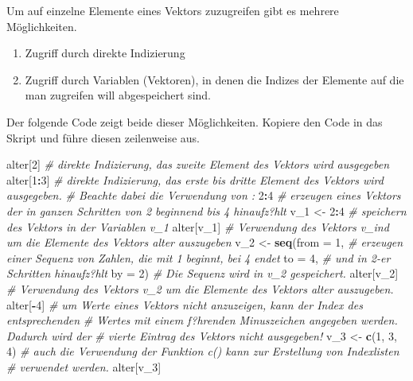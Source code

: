 \documentclass[]{article}
\newenvironment{Shaded}{\begin{snugshade}}{\end{snugshade}}
\newcommand{\KeywordTok}[1]{\textcolor[rgb]{0.13,0.29,0.53}{\textbf{#1}}}
\newcommand{\DataTypeTok}[1]{\textcolor[rgb]{0.13,0.29,0.53}{#1}}
\newcommand{\DecValTok}[1]{\textcolor[rgb]{0.00,0.00,0.81}{#1}}
\newcommand{\StringTok}[1]{\textcolor[rgb]{0.31,0.60,0.02}{#1}}
\newcommand{\CommentTok}[1]{\textcolor[rgb]{0.56,0.35,0.01}{\textit{#1}}}
\newcommand{\OperatorTok}[1]{\textcolor[rgb]{0.81,0.36,0.00}{\textbf{#1}}}
\newcommand{\NormalTok}[1]{#1}
\providecommand{\tightlist}{%
  \setlength{\itemsep}{0pt}\setlength{\parskip}{0pt}}
\begin{document}
Um auf einzelne Elemente eines Vektors zuzugreifen gibt es mehrere
Möglichkeiten.

\begin{enumerate}
\def\labelenumi{\arabic{enumi}.}
\tightlist
\item
  Zugriff durch direkte Indizierung
\item
  Zugriff durch Variablen (Vektoren), in denen die Indizes der Elemente
  auf die man zugreifen will abgespeichert sind.
\end{enumerate}

Der folgende Code zeigt beide dieser Möglichkeiten. Kopiere den Code in
das Skript und führe diesen zeilenweise aus.

\begin{Shaded}
\begin{Highlighting}[]
\NormalTok{    alter[}\DecValTok{2}\NormalTok{]   }\CommentTok{# direkte Indizierung, das zweite Element des Vektors wird ausgegeben}
\NormalTok{    alter[}\DecValTok{1}\OperatorTok{:}\DecValTok{3}\NormalTok{] }\CommentTok{# direkte Indizierung, das erste bis dritte Element des Vektors wird ausgegeben.}
               \CommentTok{# Beachte dabei die Verwendung von :}
    \DecValTok{2}\OperatorTok{:}\DecValTok{4}        \CommentTok{# erzeugen eines Vektors der in ganzen Schritten von 2 beginnend bis 4 hinaufz?hlt}
\NormalTok{    v_}\DecValTok{1}\NormalTok{ <-}\StringTok{ }\DecValTok{2}\OperatorTok{:}\DecValTok{4} \CommentTok{# speichern des Vektors in der Variablen v_1}
\NormalTok{    alter[v_}\DecValTok{1}\NormalTok{] }\CommentTok{# Verwendung des Vektors v_ind um die Elemente des Vektors alter auszugeben}
\NormalTok{    v_}\DecValTok{2}\NormalTok{ <-}\StringTok{ }\KeywordTok{seq}\NormalTok{(}\DataTypeTok{from =} \DecValTok{1}\NormalTok{,  }\CommentTok{# erzeugen einer Sequenz von Zahlen, die mit 1 beginnt, bei 4 endet}
               \DataTypeTok{to   =} \DecValTok{4}\NormalTok{,  }\CommentTok{# und in 2-er Schritten hinaufz?hlt}
               \DataTypeTok{by   =} \DecValTok{2}\NormalTok{)  }\CommentTok{# Die Sequenz wird in v_2 gespeichert.}
\NormalTok{    alter[v_}\DecValTok{2}\NormalTok{] }\CommentTok{# Verwendung des Vektors v_2 um die Elemente des Vektors alter auszugeben.}
\NormalTok{    alter[}\OperatorTok{-}\DecValTok{4}\NormalTok{]  }\CommentTok{# um Werte eines Vektors nicht anzuzeigen, kann der Index des entsprechenden}
               \CommentTok{# Wertes mit einem f?hrenden Minuszeichen angegeben werden. Dadurch wird der }
               \CommentTok{# vierte Eintrag des Vektors nicht ausgegeben!}
\NormalTok{    v_}\DecValTok{3}\NormalTok{  <-}\StringTok{ }\KeywordTok{c}\NormalTok{(}\DecValTok{1}\NormalTok{, }\DecValTok{3}\NormalTok{, }\DecValTok{4}\NormalTok{) }\CommentTok{# auch die Verwendung der Funktion c() kann zur Erstellung von Indexlisten}
                       \CommentTok{# verwendet werden.}
\NormalTok{    alter[v_}\DecValTok{3}\NormalTok{]}
\end{Highlighting}
\end{Shaded}
\end{document}
